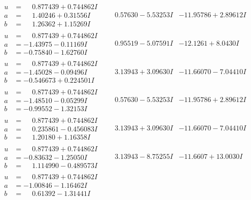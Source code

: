 \documentclass[1p]{elsarticle_modified}
\theoremstyle{definition}
\begin{document}
$$\begin{array}{c|c|c}
\begin{aligned}
u &= \phantom{-}0.877439 + 0.744862 I \\
a &= \phantom{-}1.40246 + 0.31556 I \\
b &= \phantom{-}1.26362 + 1.15269 I\end{aligned}
 & \phantom{-}0.57630 - 5.53253 I & -11.95786 + 2.89612 I \\ \hline\begin{aligned}
u &= \phantom{-}0.877439 + 0.744862 I \\
a &= -1.43975 - 0.11169 I \\
b &= -0.75840 - 1.62760 I\end{aligned}
 & \phantom{-}0.95519 - 5.07591 I & -12.1261 + 8.0430 I \\ \hline\begin{aligned}
u &= \phantom{-}0.877439 + 0.744862 I \\
a &= -1.45028 - 0.09496 I \\
b &= -0.546673 + 0.224501 I\end{aligned}
 & \phantom{-}3.13943 + 3.09630 I & -11.66070 - 7.04410 I \\ \hline\begin{aligned}
u &= \phantom{-}0.877439 + 0.744862 I \\
a &= -1.48510 - 0.05299 I \\
b &= -0.99552 - 1.32153 I\end{aligned}
 & \phantom{-}0.57630 - 5.53253 I & -11.95786 + 2.89612 I \\ \hline\begin{aligned}
u &= \phantom{-}0.877439 + 0.744862 I \\
a &= \phantom{-}0.235861 - 0.456083 I \\
b &= \phantom{-}1.20180 + 1.16358 I\end{aligned}
 & \phantom{-}3.13943 + 3.09630 I & -11.66070 - 7.04410 I \\ \hline\begin{aligned}
u &= \phantom{-}0.877439 + 0.744862 I \\
a &= -0.83632 - 1.25050 I \\
b &= \phantom{-}1.114990 - 0.489573 I\end{aligned}
 & \phantom{-}3.13943 - 8.75255 I & -11.6607 + 13.0030 I \\ \hline\begin{aligned}
u &= \phantom{-}0.877439 + 0.744862 I \\
a &= -1.00846 - 1.16462 I \\
b &= \phantom{-}0.61392 - 1.31441 I\end{aligned}

\end{array}$$
\end{document}
